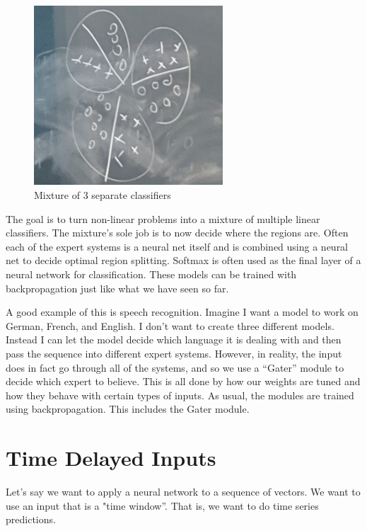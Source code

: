 \begin{figure}
    \centering
    \includegraphics[width=200pt]{figs/mixture.png}
    \caption{Mixture of 3 separate classifiers}
    \label{fig:mixture}
\end{figure}

The goal is to turn non-linear problems into a mixture of multiple linear classifiers. 
The mixture's sole job is to now decide where the regions are. 
Often each of the expert systems is a neural net itself and is combined using a neural net to decide optimal region splitting. 
Softmax is often used as the final layer of a neural network for classification. 
These models can be trained with backpropagation just like what we have seen so far. 

A good example of this is speech recognition. 
Imagine I want a model to work on German, French, and English. 
I don't want to create three different models. 
Instead I can let the model decide which language it is dealing with and then pass the sequence into different expert systems. 
However, in reality, the input does in fact go through all of the systems, and so we use a ``Gater'' module to decide which expert to believe. 
This is all done by how our weights are tuned and how they behave with certain types of inputs. 
As usual, the modules are trained using backpropagation. 
This includes the Gater module.

\section{Time Delayed Inputs}

Let's say we want to apply a neural network to a sequence of vectors. 
We want to use an input that is a "time window''. 
That is, we want to do time series predictions.

